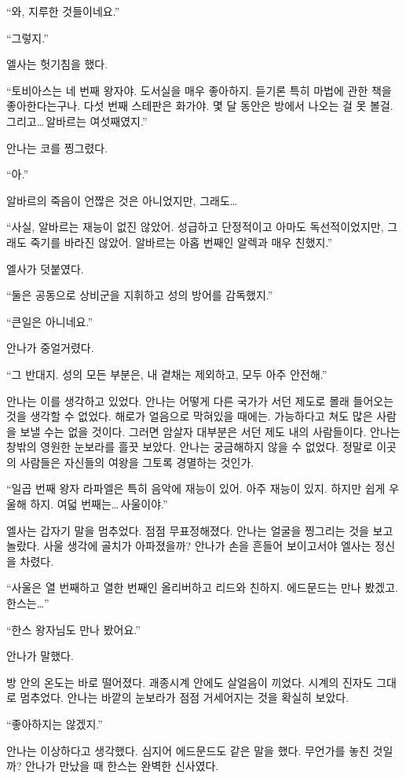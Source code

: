 ``와, 지루한 것들이네요.''

`` 그렇지.''

엘사는 헛기침을 했다.

``토비아스는 네 번째 왕자야. 도서실을 매우 좋아하지. 듣기론 특히 마법에 관한 책을 좋아한다는구나. 다섯 번째 스테판은 화가야. 몇 달 동안은 방에서 나오는 걸 못 볼걸. 그리고\ldots\,알바르는 여섯째였지.''

안나는 코를 찡그렸다.

``아.''

알바르의 죽음이 언짢은 것은 아니었지만, 그래도\ldots

``사실, 알바르는 재능이 없진 않았어. 성급하고 단정적이고 아마도 독선적이었지만, 그래도 죽기를 바라진 않았어. 알바르는 아홉 번째인 알렉과 매우 친했지.''

엘사가 덧붙였다.

``둘은 공동으로 상비군을 지휘하고 성의 방어를 감독했지.''

``큰일은 아니네요.''

안나가 중얼거렸다.

``그 반대지. 성의 모든 부분은, 내 곁채는 제외하고, 모두 아주 안전해.''

안나는 이를 생각하고 있었다. 안나는 어떻게 다른 국가가 서던 제도로 몰래 들어오는 것을 생각할 수 없었다. 해로가 얼음으로 막혀있을 때에는. 가능하다고 쳐도 많은 사람을 보낼 수는 없을 것이다. 그러면 암살자 대부분은 서던 제도 내의 사람들이다. 안나는 창밖의 영원한 눈보라를 흘끗 보았다. 안나는 궁금해하지 않을 수 없었다. 정말로 이곳의 사람들은 자신들의 여왕을 그토록 경멸하는 것인가.

``일곱 번째 왕자 라파엘은 특히 음악에 재능이 있어. 아주 재능이 있지. 하지만 쉽게 우울해 하지. 여덟 번째는\ldots\,사울이야.''

엘사는 갑자기 말을 멈추었다. 점점 무표정해졌다. 안나는 얼굴을 찡그리는 것을 보고 놀랐다. 사울 생각에 골치가 아파졌을까? 안나가 손을 흔들어 보이고서야 엘사는 정신을 차렸다.

``사울은 열 번째하고 열한 번째인 올리버하고 리드와 친하지. 에드문드는 만나 봤겠고. 한스는\ldots''

``한스 왕자님도 만나 봤어요.''

안나가 말했다.

방 안의 온도는 바로 떨어졌다. 괘종시계 안에도 살얼음이 끼었다. 시계의 진자도 그대로 멈추었다. 안나는 바깥의 눈보라가 점점 거세어지는 것을 확실히 보았다.

`` 좋아하지는 않겠지.''

안나는 이상하다고 생각했다. 심지어 에드문드도 같은 말을 했다. 무언가를 놓친 것일까? 안나가 만났을 때 한스는 완벽한 신사였다.


